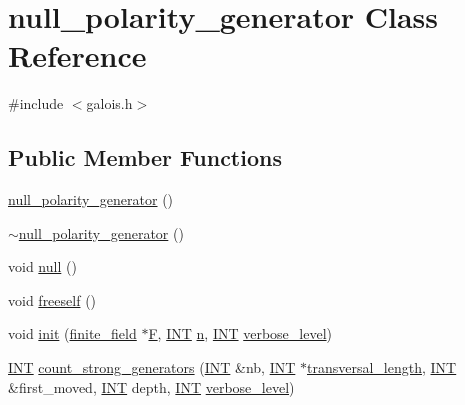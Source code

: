 \hypertarget{classnull__polarity__generator}{}\section{null\+\_\+polarity\+\_\+generator Class Reference}
\label{classnull__polarity__generator}


{\ttfamily \#include $<$galois.\+h$>$}

\subsection*{Public Member Functions}
\begin{DoxyCompactItemize}
\item 
\mbox{\hyperlink{classnull__polarity__generator_a5ae979d8b6211c0be100175052f73b98}{null\+\_\+polarity\+\_\+generator}} ()
\item 
\mbox{\hyperlink{classnull__polarity__generator_a2e9ba2cbaabba6aa1431cc2de40f7fc7}{$\sim$null\+\_\+polarity\+\_\+generator}} ()
\item 
void \mbox{\hyperlink{classnull__polarity__generator_a456ee9ba58f5e8788bedc6232dc3cc75}{null}} ()
\item 
void \mbox{\hyperlink{classnull__polarity__generator_a5e26037d889fb90c896eea1e86a14598}{freeself}} ()
\item 
void \mbox{\hyperlink{classnull__polarity__generator_acb3572953351234f30a9a73debb27646}{init}} (\mbox{\hyperlink{classfinite__field}{finite\+\_\+field}} $\ast$\mbox{\hyperlink{classnull__polarity__generator_a3c08b076b48054b8c6019a4211ceb461}{F}}, \mbox{\hyperlink{galois_8h_a09fddde158a3a20bd2dcadb609de11dc}{I\+NT}} \mbox{\hyperlink{classnull__polarity__generator_a858bb2cc3e37a69b7d704ae54e45b815}{n}}, \mbox{\hyperlink{galois_8h_a09fddde158a3a20bd2dcadb609de11dc}{I\+NT}} \mbox{\hyperlink{simeon_8_c_a818073fbcc2f439e7c56952f67386122}{verbose\+\_\+level}})
\item 
\mbox{\hyperlink{galois_8h_a09fddde158a3a20bd2dcadb609de11dc}{I\+NT}} \mbox{\hyperlink{classnull__polarity__generator_a20fe959b6b3327157126eb4468bf028b}{count\+\_\+strong\+\_\+generators}} (\mbox{\hyperlink{galois_8h_a09fddde158a3a20bd2dcadb609de11dc}{I\+NT}} \&nb, \mbox{\hyperlink{galois_8h_a09fddde158a3a20bd2dcadb609de11dc}{I\+NT}} $\ast$\mbox{\hyperlink{classnull__polarity__generator_a7ecbbcacf3cd88acbc9e236e068cc9e7}{transversal\+\_\+length}}, \mbox{\hyperlink{galois_8h_a09fddde158a3a20bd2dcadb609de11dc}{I\+NT}} \&first\+\_\+moved, \mbox{\hyperlink{galois_8h_a09fddde158a3a20bd2dcadb609de11dc}{I\+NT}} depth, \mbox{\hyperlink{galois_8h_a09fddde158a3a20bd2dcadb609de11dc}{I\+NT}} \mbox{\hyperlink{simeon_8_c_a818073fbcc2f439e7c56952f67386122}{verbose\+\_\+level}})

\end{DoxyCompactItemize}
